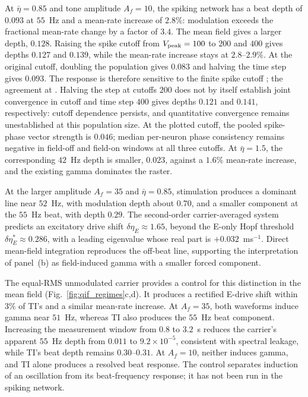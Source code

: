 \documentclass[11pt,a4paper]{article}
\providecommand{\DIFaddtex}[1]{{\protect\color{blue} \sf #1}} %
\providecommand{\DIFdeltex}[1]{{\protect\color{red} \scriptsize #1}} %
\providecommand{\DIFaddbegin}{} %
\providecommand{\DIFaddend}{} %
\providecommand{\DIFdelbegin}{} %
\providecommand{\DIFdelend}{} %
\providecommand{\DIFadd}[1]{\texorpdfstring{\DIFaddtex{#1}}{#1}} %
\providecommand{\DIFdel}[1]{\texorpdfstring{\DIFdeltex{#1}}{}} %
\begin{document}
At $\bar\eta=0.85$ and tone amplitude $A_f=10$, the spiking network has a beat
depth of $0.093$ at $55$~Hz and a mean-rate increase of $2.8\%$: modulation exceeds
the fractional mean-rate change by a factor of $3.4$. The mean field gives a
larger depth, $0.128$. Raising the spike cutoff from $V_{\rm peak}=100$ to
$200$ and $400$ gives depths $0.127$ and $0.139$, while the mean-rate increase
stays at $2.8$--$2.9\%$. At the original cutoff, doubling the population gives
$0.083$ and halving the time step gives $0.093$. The response is therefore
sensitive to the finite spike cutoff\DIFdelbegin \DIFdel{; the agreement at }\DIFdelend \DIFaddbegin \DIFadd{. Halving the step at cutoffs }\DIFaddend $200$ \DIFdelbegin \DIFdel{does not by itself
establish joint convergence in cutoff }\DIFdelend and
\DIFdelbegin \DIFdel{time step}\DIFdelend \DIFaddbegin \DIFadd{$400$ gives depths $0.121$ and $0.141$, respectively: cutoff dependence persists,
and quantitative convergence remains unestablished at this population size}\DIFaddend .
At the plotted cutoff, the pooled spike-phase vector strength is $0.046$;
median per-neuron phase consistency remains negative in field-off and field-on
windows at all three cutoffs. At
$\bar\eta=1.5$, the corresponding $42$~Hz depth is smaller, $0.023$, against a
$1.6\%$ mean-rate increase, and the existing gamma dominates the raster.

At the larger amplitude $A_f=35$ and $\bar\eta=0.85$, stimulation produces
a dominant line near $52$~Hz, with modulation depth about $0.70$, and a smaller component
at the $55$~Hz beat, with depth $0.29$. The second-order carrier-averaged system
predicts an excitatory drive shift $\delta\eta_E\approx1.65$, beyond the E-only
Hopf threshold $\delta\eta_E^*\approx0.286$, with a leading eigenvalue whose real
part is $+0.032$~ms$^{-1}$. Direct mean-field integration reproduces the off-beat
line, supporting the interpretation of panel~(b) as field-induced gamma with a
smaller forced component.

The equal-RMS unmodulated carrier provides a control for this distinction in
the mean field (Fig.~\ref{fig:qif_regimes}c,d). It produces a rectified E-drive
shift within $3\%$ of TI's and a similar mean-rate increase. At $A_f=35$, both
waveforms induce gamma near $51$~Hz, whereas TI also produces the $55$~Hz beat
component. Increasing the measurement window from $0.8$ to $3.2$~s reduces
the carrier's apparent $55$~Hz depth from $0.011$ to $9.2\times10^{-5}$,
consistent with spectral leakage, while TI's beat depth remains $0.30$--$0.31$.
At $A_f=10$, neither induces gamma, and TI alone produces a resolved beat
response. The control separates induction of an oscillation from its
beat-frequency response; it has not been run in the spiking network.
\end{document}
